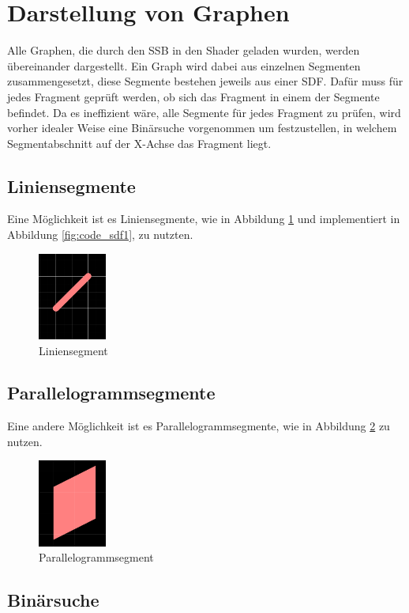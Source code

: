 \section{Darstellung von Graphen}
Alle Graphen, die durch den SSB in den Shader geladen wurden, werden übereinander dargestellt.
Ein Graph wird dabei aus einzelnen Segmenten zusammengesetzt, diese Segmente bestehen jeweils aus einer SDF.
Dafür muss für jedes Fragment geprüft werden, ob sich das Fragment in einem der Segmente befindet.
Da es ineffizient wäre, alle Segmente für jedes Fragment zu prüfen, wird vorher idealer Weise eine Binärsuche vorgenommen um festzustellen, in welchem Segmentabschnitt auf der X-Achse das Fragment liegt.
\subsection{Liniensegmente}
Eine Möglichkeit ist es Liniensegmente, wie in Abbildung \ref{fig:linie} und implementiert in Abbildung \ref{fig:code_sdf1}, zu nutzten.
\begin{figure}[ht]
	\centering
	\includegraphics[width=0.2\textwidth]{fig/linie.png}
	\caption{Liniensegment}
	\label{fig:linie}
\end{figure}
\FloatBarrier


\subsection{Parallelogrammsegmente}
Eine andere Möglichkeit ist es Parallelogrammsegmente, wie in Abbildung \ref{fig:parallelogramm} zu nutzen.
\begin{figure}[ht]
	\centering
	\includegraphics[width=0.2\textwidth]{fig/parallelogramm.png}
	\caption{Parallelogrammsegment}
	\label{fig:parallelogramm}
\end{figure}
\FloatBarrier

\subsection{Binärsuche}
\label{sec:binary}

